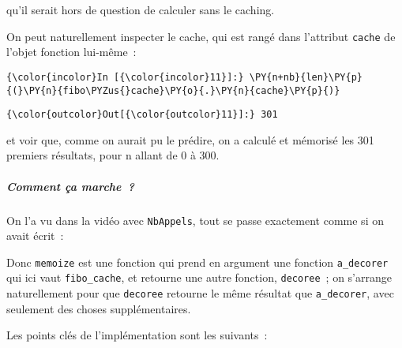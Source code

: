     qu'il serait hors de question de calculer sans le caching.

On peut naturellement inspecter le cache, qui est rangé dans l'attribut
\texttt{cache} de l'objet fonction lui-même~:

    \begin{Verbatim}[commandchars=\\\{\}]
{\color{incolor}In [{\color{incolor}11}]:} \PY{n+nb}{len}\PY{p}{(}\PY{n}{fibo\PYZus{}cache}\PY{o}{.}\PY{n}{cache}\PY{p}{)}
\end{Verbatim}


\begin{Verbatim}[commandchars=\\\{\}]
{\color{outcolor}Out[{\color{outcolor}11}]:} 301
\end{Verbatim}
            
    et voir que, comme on aurait pu le prédire, on a calculé et mémorisé les
301 premiers résultats, pour n allant de 0 à 300.

    \hypertarget{comment-uxe7a-marche}{%
\subparagraph{Comment ça marche~?}\label{comment-uxe7a-marche}}

    On l'a vu dans la vidéo avec \texttt{NbAppels}, tout se passe exactement
comme si on avait écrit~:

\begin{Shaded}
\begin{Highlighting}[]
    \OperatorTok{<}\OperatorTok{>}

\OperatorTok{=}
\end{Highlighting}
\end{Shaded}

    Donc \texttt{memoize} est une fonction qui prend en argument une
fonction \texttt{a\_decorer} qui ici vaut \texttt{fibo\_cache}, et
retourne une autre fonction, \texttt{decoree}~; on s'arrange
naturellement pour que \texttt{decoree} retourne le même résultat que
\texttt{a\_decorer}, avec seulement des choses supplémentaires.

    Les points clés de l'implémentation sont les suivants~:

